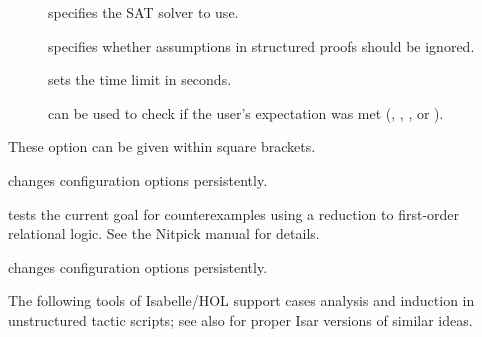 \begin{isabellebody}
\begin{isamarkuptext}
\begin{description}
\begin{description}
    \item[] specifies the SAT solver to use.

    \item[] specifies whether assumptions in
    structured proofs should be ignored.

    \item[] sets the time limit in seconds.

    \item[] can be used to check if the user's
    expectation was met (, ,
    , or ).

    \end{description}

    These option can be given within square brackets.

  \item \hyperlink{command.HOL.refute-params}{\mbox{}} changes
    \hyperlink{command.HOL.refute}{\mbox{}} configuration options persistently.

  \item \hyperlink{command.HOL.nitpick}{\mbox{}} tests the current goal for counterexamples
    using a reduction to first-order relational logic. See the Nitpick manual
    \cite{isabelle-nitpick} for details.

  \item \hyperlink{command.HOL.nitpick-params}{\mbox{}} changes
    \hyperlink{command.HOL.nitpick}{\mbox{}} configuration options persistently.

  \end{description}%
\end{isamarkuptext}%
\isamarkuptrue%
%
\isamarkuptrue%
%
\begin{isamarkuptext}%
The following tools of Isabelle/HOL support cases analysis and
  induction in unstructured tactic scripts; see also
   for proper Isar versions of similar ideas.


\end{isamarkuptext}
\end{isabellebody}
